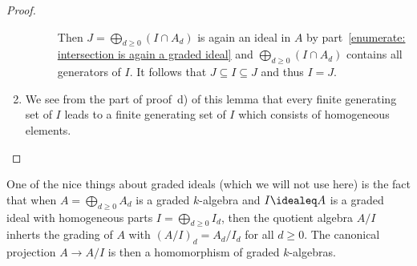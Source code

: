 \begin{proof}
\begin{enumerate}
\begin{description}
          Then $J = \bigoplus_{d \geq 0} (I \cap A_d)$ is again an ideal in $A$ by part~\ref*{enumerate: intersection is again a graded ideal} and $\bigoplus_{d \geq 0} (I \cap A_d)$ contains all generators of $I$.
          It follows that $J \subseteq I \subseteq J$ and thus $I = J$.
      \end{description}
%       
%       
%       
%       
    \item
      We see from the part of proof~d) of this lemma that every finite generating set of $I$ leads to a finite generating set of $I$ which consists of homogeneous elements.
    \qedhere
  \end{enumerate}
\end{proof}


\begin{remark}
  \label{remark: quotient by homogeneous ideals are again graded}
  One of the nice things about graded ideals (which we will not use here) is the fact that when $A = \bigoplus_{d \geq 0} A_d$ is a graded $k$-algebra and $I \idealeq A$ is a graded ideal with homogeneous parts $I = \bigoplus_{d \geq 0} I_d$, then the quotient algebra $A/I$ inherts the grading of $A$ with $(A/I)_d = A_d/I_d$ for all $d \geq 0$.
  The canonical projection $A \to A/I$ is then a homomorphism of graded $k$-algebras.
\end{remark}


